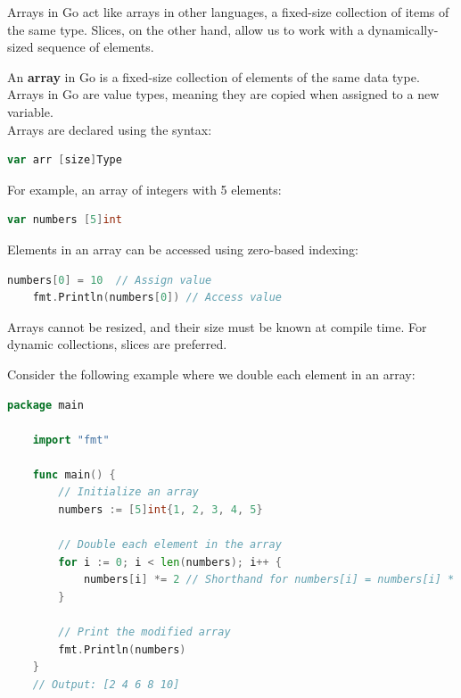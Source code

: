 \noindent
Arrays in Go act like arrays in other languages, a fixed-size collection of items of the same type. Slices, on the other hand, allow us to work with a dynamically-sized sequence of elements.

\begin{Def}[Arrays in Go]

    An \textbf{array} in Go is a fixed-size collection of elements of the same data type. Arrays in Go are value types, meaning they are copied when assigned to a new variable.\\
    
    \noindent
    Arrays are declared using the syntax:
    \begin{lstlisting}[language=Go]
    var arr [size]Type
    \end{lstlisting}
    
    \noindent
    For example, an array of integers with 5 elements:
    \begin{lstlisting}[language=Go]
    var numbers [5]int
    \end{lstlisting}
    
    \noindent
    Elements in an array can be accessed using zero-based indexing:
    \begin{lstlisting}[language=Go]
    numbers[0] = 10  // Assign value
    fmt.Println(numbers[0]) // Access value
    \end{lstlisting}
    
    \noindent
    Arrays cannot be resized, and their size must be known at compile time. For dynamic collections, slices are preferred.
\end{Def}

\begin{Example}

    Consider the following example where we double each element in an array:
    \begin{lstlisting}[language=Go, numbers=none]
    package main

    import "fmt"

    func main() {
        // Initialize an array
        numbers := [5]int{1, 2, 3, 4, 5}

        // Double each element in the array
        for i := 0; i < len(numbers); i++ {
            numbers[i] *= 2 // Shorthand for numbers[i] = numbers[i] * 2
        }

        // Print the modified array
        fmt.Println(numbers)
    }
    // Output: [2 4 6 8 10]
    \end{lstlisting}
\end{Example}

